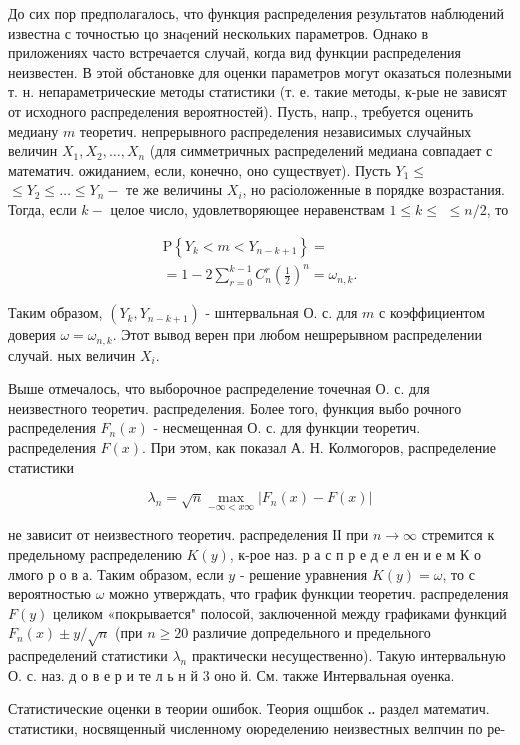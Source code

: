 \documentclass[10pt]{article}
\begin{document}
До сих пор предполагалось, что функция распределения результатов наблюдений известна с точностью цо знаqений нескольких параметров. Однако в приложениях часто встречается случай, когда вид функции распределения неизвестен. В этой обстановке для оценки параметров могут оказаться полезными т. н. непараметрические методы статистики (т. е. такие методы, к-рые не зависят от исходного распределения вероятностей). Пусть, напр., требуется оценить медиану $m$ теоретич. непрерывного распределения независимых случайных величин $X_{1}, X_{2}, \ldots, X_{n}$ (для симметричных распределений медиана совпадает с математич. ожиданием, если, конечно, оно существует). Пусть $Y_{1} \leqslant$ $\leqslant Y_{2} \leqslant \ldots \leqslant Y_{n}-$ те же величины $X_{i}$, но расіоложенные в порядке возрастания. Тогда, если $k-$ целое число, удовлетворяющее неравенствам $1 \leqslant k \leqslant$ $\leqslant n / 2$, то



\[

\begin{gathered}

\mathrm{P}\left\{Y_{k}<m<Y_{n-k+1}\right\}= \\

=1-2 \sum_{r=0}^{k-1} C_{n}^{r}\left(\frac{1}{2}\right)^{n}=\omega_{n, k} .

\end{gathered}

\]



Таким образом, $\left(Y_{k}, Y_{n-k+1}\right)$ - шнтервальная О. с. для $m$ с коэффициентом доверия $\omega=\omega_{n, k}$. Этот вывод верен при любом нешрерывном распределении случай. ных величин $X_{i}$.



Выше отмечалось, что выборочное распределение точечная О. с. для неизвестного теоретич. распределения. Более того, функция выбо рочного распределения $F_{n}(x)$ - несмещенная О. с. для функции теоретич. распределения $F(x)$. При этом, как показал А. Н. Колмогоров, распределение статистики



\[

\lambda_{n}=\sqrt{n} \max _{-\infty<x \infty}\left|F_{n}(x)-F(x)\right|

\]



не зависит от неизвестного теоретич. распределения ІІ при $n \rightarrow \infty$ стремится к предельному распределению $K(y)$, к-рое наз. р а с п р е д е л ен и е м К о лмого р о в а. Таким образом, если $y$ - решение уравнения $K(y)=\omega$, то с вероятностью $\omega$ можно утверждать, что график функции теоретич. распределения $F(y)$ целиком «покрывается" полосой, заключенной между графиками функций $F_{n}(x) \pm y / \sqrt{n}$ (при $n \geqslant 20$ различие допредельного и предельного распределений статистики $\lambda_{n}$ практически несущественно). Такую интервальную О. с. наз. д о в е р и те л ь н й 3 оно й. См. также Интервальная оуенка.



Статистические оценки в теории ошибок. Теория ощшбок ‥ раздел математич. статистики, носвященный численному оюределению неизвестных велпчин по ре-
\end{document}
